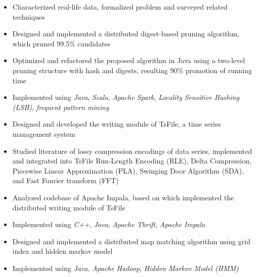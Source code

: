 \documentclass{resume}
\begin{document}
\begin{itemize}
  \item Characterized real-life data, formalized problem and surveyed related techniques
  \item Designed and implemented a distributed digest-based pruning algorithm, which pruned 99.5\% candidates 
  \item Optimized and refactored the proposed algorithm in Java using a two-level pruning structure with hash and digests, resulting 90\% promotion of running time
  \item Implemented using \emph{Java}, \emph{Scala}, \emph{Apache Spark}, \emph{Locality Sensitive Hashing (LSH)}, \emph{frequent pattern mining}
\end{itemize}

\begin{itemize}
  \item Designed and developed the writing module of TsFile, a time series management system
  \item Studied literature of lossy compression encodings of data series, implemented and integrated into TsFile 
  Run-Length Encoding (RLE), Delta Compression, Piecewise Linear Approximation (PLA), Swinging Door Algorithm (SDA), and Fast Fourier transform (FFT)
  \item Analyzed codebase of Apache Impala, based on which implemented the distributed writing module of TsFile
  \item Implemented using \emph{C++}, \emph{Java}, \emph{Apache Thrift}, \emph{Apache Impala}
\end{itemize}

\begin{itemize}
  \item Designed and implemented a distributed map matching algorithm using grid index and hidden markov model
  \item Implemented using \emph{Java}, \emph{Apache Hadoop}, \emph{Hidden Markov Model (HMM)}
\end{itemize}
\end{document}
